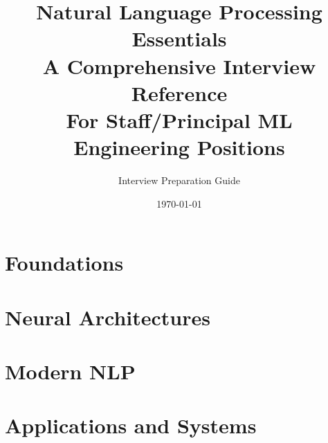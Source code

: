 \documentclass[11pt,twoside]{book}
\title{
    \Huge\textbf{Natural Language Processing Essentials}\\[0.5cm]
    \Large A Comprehensive Interview Reference\\[0.3cm]
    \large For Staff/Principal ML Engineering Positions
}
\author{Interview Preparation Guide}
\date{\today}
\theoremstyle{definition}
\theoremstyle{plain}
\begin{document}
\frontmatter
\maketitle
\tableofcontents

\mainmatter

\part{Foundations}





\part{Neural Architectures}




\part{Modern NLP}





\part{Applications and Systems}






\end{document}
